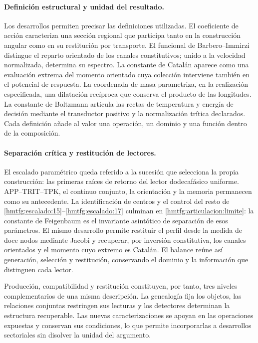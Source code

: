 \paragraph{Definición estructural y unidad del resultado.}
Los desarrollos permiten precisar las definiciones utilizadas. El
coeficiente de acción caracteriza una sección regional que participa tanto
en la construcción angular como en su restitución por transporte. El
funcional de Barbero--Immirzi distingue el reparto orientado de los canales
constitutivos; unido a la velocidad normalizada, determina su espectro.
La constante de Catalán aparece como una evaluación extrema del momento
orientado cuya colección interviene también en el potencial de respuesta.
La coordenada de masa parametriza, en la realización especificada, una
dilatación recíproca que conserva el producto de las longitudes. La
constante de Boltzmann articula las rectas de temperatura y energía de
decisión mediante el transductor positivo y la normalización trítica
declarados. Cada definición añade al valor una operación, un dominio y una
función dentro de la composición.

\paragraph{Separación crítica y restitución de lectores.}
El escalado paramétrico queda referido a la sucesión que selecciona la propia construcción: las primeras raíces de retorno del lector dodecafásico uniforme. APP--TRIT--TPK, el continuo conjunto, la orientación y la memoria permanecen como su antecedente. La identificación de centros y el control del resto de \ref{hmtfg:escalado:15}--\ref{hmtfg:escalado:17} culminan en \eqref{hmtfg:articulacion:limite}: la constante de Feigenbaum es el invariante asintótico de separación de esos parámetros. El mismo desarrollo permite restituir el perfil desde la medida de doce nodos mediante Jacobi y recuperar, por inversión constitutiva, los canales orientados y el momento cuyo extremo es Catalán. El balance reúne así generación, selección y restitución, conservando el dominio y la información que distinguen cada lector.




Producción, compatibilidad y restitución constituyen, por tanto, tres
niveles complementarios de una misma descripción. La genealogía fija
los objetos, las relaciones conjuntas restringen sus lecturas y los
detectores determinan la estructura recuperable. Las nuevas
caracterizaciones se apoyan en las operaciones expuestas y conservan
sus condiciones, lo que permite incorporarlas a desarrollos sectoriales
sin disolver la unidad del argumento.
